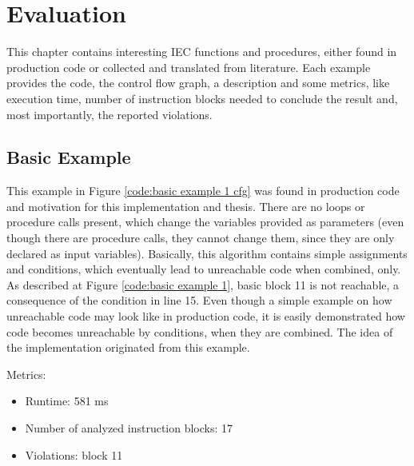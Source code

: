
\chapter {Evaluation}
\label {cha:evaluation}
This chapter contains interesting IEC functions and procedures, either found in production code or collected and translated from literature.
Each example provides the code, the control flow graph, a description and some metrics, like execution time, number of instruction blocks needed to conclude the result and, most importantly, the reported violations.


\section{Basic Example}
This example in Figure \ref{code:basic example 1 cfg} was found in production code and motivation for this implementation and thesis. There are no loops or procedure calls present, which change the variables provided as parameters (even though there are procedure calls, they cannot change them, since they are only declared as input variables).
Basically, this algorithm contains simple assignments and conditions, which eventually lead to unreachable code when combined, only.
As described at Figure \ref{code:basic example 1}, basic block 11 is not reachable, a consequence of the condition in line 15.
Even though a simple example on how unreachable code may look like in production code, it is easily demonstrated how code becomes unreachable by conditions, when they are combined.
The idea of the implementation originated from this example.

Metrics:
\begin{itemize}
	\item Runtime: 581 ms
	\item Number of analyzed instruction blocks: 17
	\item Violations: block 11
\end{itemize}


